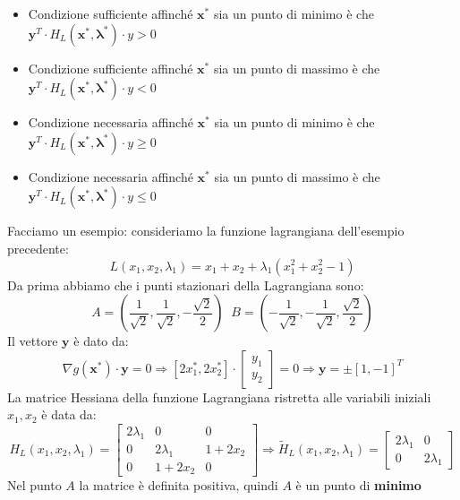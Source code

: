 \documentclass[12pt]{article}
\begin{document}
\begin{itemize}
    \item Condizione sufficiente affinché $\boldsymbol{x}^*$ sia un punto di minimo è che \newline $\boldsymbol{y}^T \cdot H_L(\boldsymbol{x}^*, \boldsymbol{\lambda}^*) \cdot y > 0$
    \item Condizione sufficiente affinché $\boldsymbol{x}^*$ sia un punto di massimo è che \newline $\boldsymbol{y}^T \cdot H_L(\boldsymbol{x}^*, \boldsymbol{\lambda}^*) \cdot y < 0$
    \item Condizione necessaria affinché $\boldsymbol{x}^*$ sia un punto di minimo è che \newline $\boldsymbol{y}^T \cdot H_L(\boldsymbol{x}^*, \boldsymbol{\lambda}^*) \cdot y \geq 0$
    \item Condizione necessaria affinché $\boldsymbol{x}^*$ sia un punto di massimo è che \newline $\boldsymbol{y}^T \cdot H_L(\boldsymbol{x}^*, \boldsymbol{\lambda}^*) \cdot y \leq 0$
\end{itemize}
Facciamo un esempio: consideriamo la funzione lagrangiana dell'esempio precedente:
$$L(x_1,x_2, \lambda_1) = x_1 + x_2 + \lambda_1(x_1^2+x_2^2 - 1)$$
Da prima abbiamo che i punti stazionari della Lagrangiana sono:
$$A = \left (\frac{1}{\sqrt{2}}, \frac{1}{\sqrt{2}}, -\frac{\sqrt{2}}{2} \right ) \; \; B = \left (-\frac{1}{\sqrt{2}}, -\frac{1}{\sqrt{2}}, \frac{\sqrt{2}}{2} \right )$$
Il vettore $\boldsymbol{y}$ è dato da:
$$\nabla g(\boldsymbol{x}^*) \cdot \boldsymbol{y} = 0 \Rightarrow [2x_1^*, 2x_2^*] \cdot \begin{bmatrix}
    y_1 \\
    y_2
\end{bmatrix} = 0 \Rightarrow \boldsymbol{y} = \pm [1, -1]^T$$
La matrice Hessiana della funzione Lagrangiana ristretta alle variabili iniziali $x_1,x_2$ è data da:
$$H_L(x_1,x_2, \lambda_1) = \begin{bmatrix}
    2\lambda_1 & 0 & 0 \\
    0 & 2\lambda_1 & 1 + 2x_2 \\
    0 & 1 + 2x_2 & 0
\end{bmatrix} \Rightarrow \tilde{H}_L(x_1,x_2, \lambda_1) = \begin{bmatrix}
    2\lambda_1 & 0 \\
    0 & 2\lambda_1
\end{bmatrix}$$
Nel punto $A$ la matrice è definita positiva, quindi $A$ è un punto di \textbf{minimo} \newline
\end{document}
